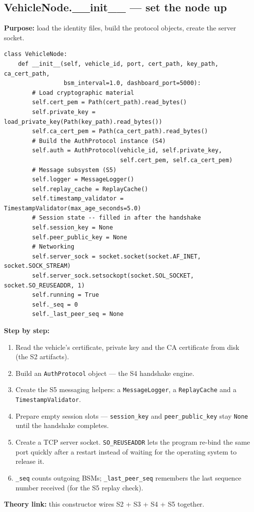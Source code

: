 \documentclass[11pt,a4paper]{report}
\begin{document}
\subsection{VehicleNode.\_\_init\_\_ --- set the node up}
\textbf{Purpose:} load the identity files, build the protocol objects, create the
server socket.
\begin{lstlisting}[style=py,caption={vehicle\_node.py --- the VehicleNode constructor (key parts).}]
class VehicleNode:
    def __init__(self, vehicle_id, port, cert_path, key_path, ca_cert_path,
                 bsm_interval=1.0, dashboard_port=5000):
        # Load cryptographic material
        self.cert_pem = Path(cert_path).read_bytes()
        self.private_key = load_private_key(Path(key_path).read_bytes())
        self.ca_cert_pem = Path(ca_cert_path).read_bytes()
        # Build the AuthProtocol instance (S4)
        self.auth = AuthProtocol(vehicle_id, self.private_key,
                                 self.cert_pem, self.ca_cert_pem)
        # Message subsystem (S5)
        self.logger = MessageLogger()
        self.replay_cache = ReplayCache()
        self.timestamp_validator = TimestampValidator(max_age_seconds=5.0)
        # Session state -- filled in after the handshake
        self.session_key = None
        self.peer_public_key = None
        # Networking
        self.server_sock = socket.socket(socket.AF_INET, socket.SOCK_STREAM)
        self.server_sock.setsockopt(socket.SOL_SOCKET, socket.SO_REUSEADDR, 1)
        self.running = True
        self._seq = 0
        self._last_peer_seq = None
\end{lstlisting}
\textbf{Step by step:}
\begin{enumerate}
  \item Read the vehicle's certificate, private key and the CA certificate from
        disk (the S2 artifacts).
  \item Build an \texttt{AuthProtocol} object --- the S4 handshake engine.
  \item Create the S5 messaging helpers: a \texttt{MessageLogger}, a
        \texttt{ReplayCache} and a \texttt{TimestampValidator}.
  \item Prepare empty session slots --- \texttt{session\_key} and
        \texttt{peer\_public\_key} stay \texttt{None} until the handshake
        completes.
  \item Create a TCP server socket. \texttt{SO\_REUSEADDR} lets the program
        re-bind the same port quickly after a restart instead of waiting for the
        operating system to release it.
  \item \texttt{\_seq} counts outgoing BSMs; \texttt{\_last\_peer\_seq} remembers
        the last sequence number received (for the S5 replay check).
\end{enumerate}
\textbf{Theory link:} this constructor wires S2 + S3 + S4 + S5 together.
\end{document}
